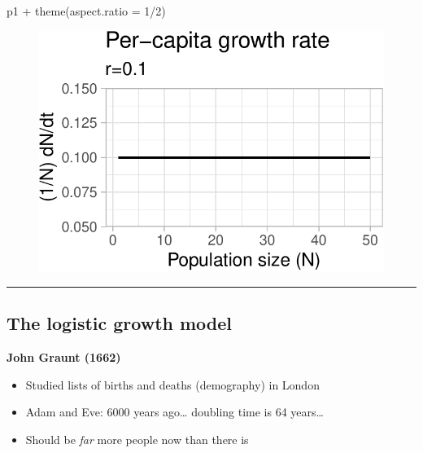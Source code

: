 \documentclass[
  letterpaper,
  DIV=11,
  numbers=noendperiod]{scrartcl}
\newenvironment{Shaded}{\begin{snugshade}}{\end{snugshade}}
\newcommand{\AttributeTok}[1]{\textcolor[rgb]{0.40,0.45,0.13}{#1}}
\newcommand{\DecValTok}[1]{\textcolor[rgb]{0.68,0.00,0.00}{#1}}
\newcommand{\FunctionTok}[1]{\textcolor[rgb]{0.28,0.35,0.67}{#1}}
\newcommand{\NormalTok}[1]{\textcolor[rgb]{0.00,0.23,0.31}{#1}}
\newcommand{\SpecialCharTok}[1]{\textcolor[rgb]{0.37,0.37,0.37}{#1}}
\begin{document}
\begin{Shaded}
\begin{Highlighting}[]
\NormalTok{p1 }\SpecialCharTok{+} \FunctionTok{theme}\NormalTok{(}\AttributeTok{aspect.ratio =} \DecValTok{1}\SpecialCharTok{/}\DecValTok{2}\NormalTok{)}
\end{Highlighting}
\end{Shaded}

\begin{figure}[H]

{\centering \includegraphics{ecological_interactions_files/figure-pdf/unnamed-chunk-4-1.pdf}

}

\end{figure}

\begin{center}\rule{0.5\linewidth}{0.5pt}\end{center}

\hypertarget{the-logistic-growth-model}{%
\subsection{The logistic growth model}\label{the-logistic-growth-model}}

\textbf{John Graunt (1662)}

\begin{itemize}
\item
  Studied lists of births and deaths (demography) in London
\item
  Adam and Eve: 6000 years ago\ldots{} doubling time is 64 years\ldots{}
\item
  Should be \emph{far} more people now than there is
\end{itemize}
\end{document}
